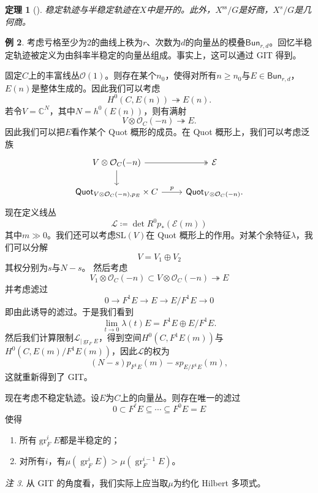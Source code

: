 \documentclass{amsart}
\newtheorem{thm}{定理}[section]
\theoremstyle{definition}
\newtheorem{exm}[thm]{例}
\theoremstyle{remark}
\newtheorem{rmk}[thm]{注}
\theoremstyle{plain}
\theoremstyle{definition}
\theoremstyle{remark}
\newcommand{\C}{\mathbb{C}}
\newcommand{\mc}[1]{\mathcal{#1}}
\newcommand{\mr}[1]{\mathrm{#1}}
\newcommand{\on}[1]{\operatorname{#1}}
\newcommand{\ms}[1]{\mathsf{#1}}
\newcommand{\1}{\mathbf{1}}
\newcommand{\2}{\mathbf{2}}
\newcommand{\3}{\mathbf{3}}
\begin{document}
\begin{thm}[{\cite{MFK1994}}]
    稳定轨迹与半稳定轨迹在\(X\)中是开的。此外，\(X^{\on{ss}}/G\)是好商，\(X^s/G\)是几何商。
\end{thm}

\begin{exm}
    考虑亏格至少为\(2\)的曲线上秩为\(r\)、次数为\(d\)的向量丛的模叠\(\ms{Bun}_{r,d}\)。回忆半稳定轨迹被定义为由斜率半稳定的向量丛组成。事实上，这可以通过 GIT 得到。

    固定\(C\)上的丰富线丛\(\mc{O}(1)\)。则存在某个\(n_0\)，使得对所有\(n \geq n_0\)与\(E \in \ms{Bun}_{r,d}\)，\(E(n)\)是整体生成的。因此我们可以考虑
    \[ H^0(C, E(n)) \twoheadrightarrow E(n). \]
    若令\(V = \C^N\)，其中\(N = h^0(E(n))\)，则有满射
    \[ V \otimes \mc{O}_C(-n) \twoheadrightarrow E. \]
    因此我们可以把\(E\)看作某个 Quot 概形的成员。在 Quot 概形上，我们可以考虑泛族
    \begin{equation*}
    \begin{tikzcd}
        V \otimes \mc{O}_C(-n) \ar[twoheadrightarrow]{r} \ar{d} & \mc{E} \\
        \ms{Quot}_{V \otimes \mc{O}_C(-n), p_E} \times C \ar{r}{p} & \ms{Quot}_{V \otimes \mc{O}_C(-n)}.
    \end{tikzcd}
    \end{equation*}
    现在定义线丛
    \[ \mc{L} \coloneqq \det R^0 p_* (\mc{E}(m)) \]
    其中\(m \gg 0\)。我们还可以考虑\(\mr{SL}(V)\)在 Quot 概形上的作用。对某个余特征\(\lambda\)，我们可以分解
    \[ V = V_1 \oplus V_2 \]
    其权分别为\(s\)与\(N-s\)。
    然后考虑
    \[ V_1 \otimes \mc{O}_C(-n) \subset V \otimes \mc{O}_C(-n) \twoheadrightarrow E \]
    并考虑滤过
    \[ 0 \to F^1 E \to E \to E / F^1 E \to 0 \]
    即由此诱导的滤过。于是我们看到
    \[ \lim_{t \to 0} \lambda(t) E = F^1 E \oplus E/F^1 E. \]
    然后我们计算限制\(\mc{L}_{|\on{gr}_F E}\)，得到空间\(H^0(C, F^1 E(m))\)与\(H^0(C, E(m)/F^1 E(m))\)，因此\(\mc{L}\)的权为
    \[ (N-s) p_{F^1 E}(m) - s p_{E/F^1 E}(m), \]
    这就重新得到了 GIT。
\end{exm}

现在考虑不稳定轨迹。设\(E\)为\(C\)上的向量丛。则存在唯一的滤过
\[ 0 \subset F^{\ell} E \subseteq \cdots \subseteq F^0 E = E \]
使得
\begin{enumerate}
    \item 所有\(\on{gr}_F^i E\)都是半稳定的；
    \item 对所有\(i\)，有\(\mu(\on{gr}_F^i E) > \mu(\on{gr}_F^{i-1} E)\)。
\end{enumerate}
\begin{rmk}
    从 GIT 的角度看，我们实际上应当取\(\mu\)为约化 Hilbert 多项式。
\end{rmk}
\end{document}

